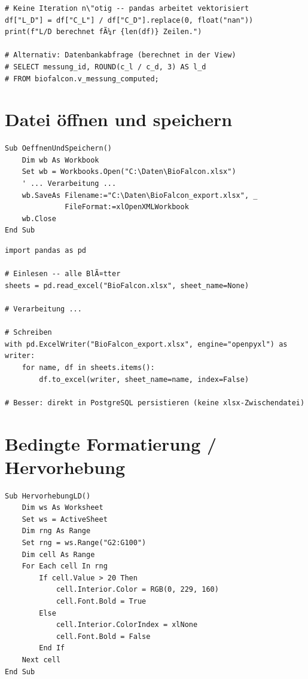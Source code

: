 ﻿\documentclass[12pt,a4paper]{report}
\theoremstyle{definition}
\theoremstyle{remark}
\begin{document}
\begin{lstlisting}[style=python, caption={Python-\"Aquivalent: Vektorisierte Berechnung}]
# Keine Iteration n\"otig -- pandas arbeitet vektorisiert
df["L_D"] = df["C_L"] / df["C_D"].replace(0, float("nan"))
print(f"L/D berechnet fÃ¼r {len(df)} Zeilen.")

# Alternativ: Datenbankabfrage (berechnet in der View)
# SELECT messung_id, ROUND(c_l / c_d, 3) AS l_d
# FROM biofalcon.v_messung_computed;
\end{lstlisting}

\section{Datei \"offnen und speichern}

\begin{lstlisting}[style=vba, caption={VBA: Workbook \"offnen und speichern}]
Sub OeffnenUndSpeichern()
    Dim wb As Workbook
    Set wb = Workbooks.Open("C:\Daten\BioFalcon.xlsx")
    ' ... Verarbeitung ...
    wb.SaveAs Filename:="C:\Daten\BioFalcon_export.xlsx", _
              FileFormat:=xlOpenXMLWorkbook
    wb.Close
End Sub
\end{lstlisting}

\begin{lstlisting}[style=python, caption={Python-\"Aquivalent: pandas read/write}]
import pandas as pd

# Einlesen -- alle BlÃ¤tter
sheets = pd.read_excel("BioFalcon.xlsx", sheet_name=None)

# Verarbeitung ...

# Schreiben
with pd.ExcelWriter("BioFalcon_export.xlsx", engine="openpyxl") as writer:
    for name, df in sheets.items():
        df.to_excel(writer, sheet_name=name, index=False)

# Besser: direkt in PostgreSQL persistieren (keine xlsx-Zwischendatei)
\end{lstlisting}

\section{Bedingte Formatierung / Hervorhebung}

\begin{lstlisting}[style=vba, caption={VBA: Zellen bei L/D > 20 grÃ¼n einfÃ¤rben}]
Sub HervorhebungLD()
    Dim ws As Worksheet
    Set ws = ActiveSheet
    Dim rng As Range
    Set rng = ws.Range("G2:G100")
    Dim cell As Range
    For Each cell In rng
        If cell.Value > 20 Then
            cell.Interior.Color = RGB(0, 229, 160)
            cell.Font.Bold = True
        Else
            cell.Interior.ColorIndex = xlNone
            cell.Font.Bold = False
        End If
    Next cell
End Sub
\end{lstlisting}
\end{document}
